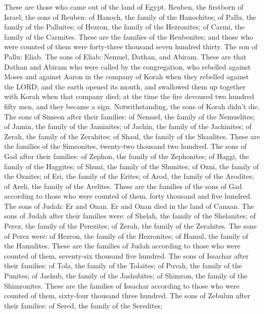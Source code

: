 These are those who came out of the land of Egypt.
\myverse{}Reuben, the firstborn of Israel; the sons of Reuben: of Hanoch, the family
of the Hanochites; of Pallu, the family of the Palluites;
\myverse{}of Hezron, the family of the Hezronites; of Carmi, the family of the Carmites.
\myverse{}These are the families of the Reubenites; and those who were counted of them
were forty-three thousand seven hundred thirty.
\myverse{}The son of Pallu: Eliab.
\myverse{}The sons of Eliab: Nemuel, Dathan, and Abiram. These are that Dathan and Abiram
who were called by the congregation, who rebelled against Moses and against Aaron in the company of Korah
when they rebelled against the LORD;
\myverse{}and the earth opened its mouth, and swallowed them up together with Korah
when that company died; at the time the fire devoured two hundred fifty men, and they became a sign.
\myverse{}Notwithstanding, the sons of Korah didn’t die.
\myverse{}The sons of Simeon after their families: of Nemuel, the family of the Nemuelites;
of Jamin, the family of the Jaminites; of Jachin, the family of the Jachinites;
\myverse{}of Zerah, the family of the Zerahites; of Shaul, the family of the Shaulites.
\myverse{}These are the families of the Simeonites, twenty-two thousand two hundred.
\myverse{}The sons of Gad after their families: of Zephon, the family of the Zephonites;
of Haggi, the family of the Haggites; of Shuni, the family of the Shunites;
\myverse{}of Ozni, the family of the Oznites; of Eri, the family of the Erites;
\myverse{}of Arod, the family of the Arodites; of Areli, the family of the Arelites.
\myverse{}These are the families of the sons of Gad according to those who were counted
of them, forty thousand and five hundred.
\myverse{}The sons of Judah: Er and Onan. Er and Onan died in the land of Canaan.
\myverse{}The sons of Judah after their families were: of Shelah, the family of the
Shelanites; of Perez, the family of the Perezites; of Zerah, the family of the Zerahites.
\myverse{}The sons of Perez were: of Hezron, the family of the Hezronites; of Hamul,
the family of the Hamulites.
\myverse{}These are the families of Judah according to those who were counted of them,
seventy-six thousand five hundred.
\myverse{}The sons of Issachar after their families: of Tola, the family of the Tolaites;
of Puvah, the family of the Punites;
\myverse{}of Jashub, the family of the Jashubites; of Shimron, the family of the Shimronites.
\myverse{}These are the families of Issachar according to those who were counted of
them, sixty-four thousand three hundred.
\myverse{}The sons of Zebulun after their families: of Sered, the family of the Seredites;

